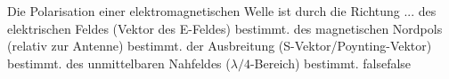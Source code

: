    {Die Polarisation einer elektromagnetischen Welle ist durch die Richtung ...}
    {des elektrischen Feldes (Vektor des E-Feldes) bestimmt.}
    {des magnetischen Nordpols (relativ zur Antenne) bestimmt.}
    {der Ausbreitung (S-Vektor/Poynting-Vektor) bestimmt.}
    {des unmittelbaren Nahfeldes ($\lambda/4$-Bereich) bestimmt.}
    {false}{false}